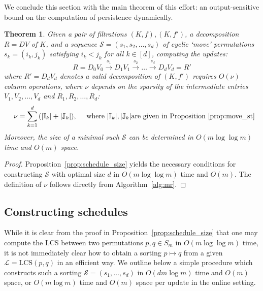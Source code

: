 \documentclass[sn-mathphys]{sn-jnl}
\newtheorem{theorem}{Theorem}
\begin{document}
We conclude this section with the main theorem of this effort: an output-sensitive bound on the computation of persistence dynamically.
  \begin{theorem}\label{prop:sparsity_result}
   Given a pair of filtrations $(K,f), (K,f')$, a decomposition $R = DV$ of $K$, and a sequence $\mathcal{S} = \left( s_1, s_2, \dots, s_d \right)$ of cyclic `move' permutations $s_k = (i_k, j_k)$ satisfying $i_k < j_k$ for all $k \in [d]$, computing the updates:
   \begin{equation}\label{eq:rv_seq_theorem}
   		R = D_0 V_0 \overset{s_1}{\to} D_1 V_{1} \overset{s_2}{\to} \dots \overset{s_d}{\to} D_d V_{d} = R'
   	\end{equation}
   	where $R' = D_d V_d$ denotes a valid decomposition of $(K, f')$ requires $O(\nu)$ column operations, where $\nu$ depends on the sparsity of the intermediate entries $V_1, V_2, \dots, V_d$ and $R_1, R_2, \dots, R_d$:	  
   	$$  \quad \nu = \sum\limits_{k = 1}^d \, (\lvert \mathbb{I}_{k} \rvert + \lvert \mathbb{J}_{k} \rvert), \quad \text{ where }  \lvert \mathbb{I}_{k} \rvert, \lvert \mathbb{J}_{k} \rvert \text{are given in Proposition~\ref{prop:move_st} } $$ 
   	Moreover, the size of a minimal such $\mathcal{S}$ can be determined in $O(m \log \log m)$ time and $O(m)$ space. 
\end{theorem}
\begin{proof} \normalsize
	Proposition~\ref{prop:schedule_size} yields the necessary conditions for constructing $\mathcal{S}$  with optimal size $d$ in $O(m \log \log m)$ time and $O(m)$. The definition of $\nu$ follows directly from Algorithm~\ref{alg:mr}. 
\end{proof}

 
\subsection{Constructing schedules}\label{sec:schedule_construction}
While it is clear from the proof in Proposition~\ref{prop:schedule_size} that one may compute the LCS between two permutations $p, q \in S_m$ in $O(m \log \log m)$ time, it is not immediately clear how to obtain a sorting $p \mapsto q$ from a given $\mathcal{L} = \mathrm{LCS}(p,q)$ in an efficient way. We outline below a simple procedure which constructs such a sorting $\mathcal{S} = (s_1, \dots, s_d)$ in $O(dm\log m)$ time and $O(m)$ space, or $O(m \log m)$ time and $O(m)$ space per update in the online setting.
 
\end{document}
